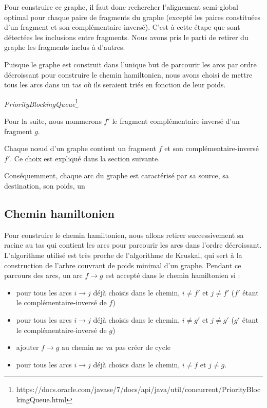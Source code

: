 \documentclass{article}
\begin{document}
Pour construire ce graphe, il faut donc rechercher l'alignement semi-global optimal pour chaque paire de fragments du graphe (excepté les paires constituées d'un fragment et son complémentaire-inversé). C'est à cette étape que sont détectées les inclusions entre fragments. Nous avons pris le parti de retirer du graphe les fragments inclus à d'autres.

Puisque le graphe est construit dans l'unique but de parcourir les arcs par ordre décroissant pour construire le chemin hamiltonien, nous avons choisi de mettre tous les arcs dans un tas où ils seraient triés en fonction de leur poids.

\textit{PriorityBlockingQueue}\footnote{https://docs.oracle.com/javase/7/docs/api/java/util/concurrent/PriorityBlockingQueue.html}

Pour la suite, nous nommerons $f'$ le fragment complémentaire-inversé d'un fragment $g$. 

Chaque nœud d'un graphe contient un fragment $f$ et son complémentaire-inversé $f'$. Ce choix est expliqué dans la section suivante.

Conséquemment, chaque arc du graphe est caractérisé par sa source, sa destination, son poids, un

\subsection{Chemin hamiltonien}

Pour construire le chemin hamiltonien, nous allons retirer successivement sa racine au tas qui contient les arcs pour parcourir les arcs dans l'ordre décroissant. L'algorithme utilisé est très proche de l'algorithme de Kruskal, qui sert à la construction de l'arbre couvrant de poids minimal d'un graphe.
Pendant ce parcours des arcs, un arc $f \to g$ est accepté dans le chemin hamiltonien si :

\begin{itemize}
\item pour tous les arcs $i \to j$ déjà choisis dans le chemin, $i \neq f'$ et $j \neq f'$  ($f'$ étant le complémentaire-inversé de $f$)
\item pour tous les arcs $i \to j$ déjà choisis dans le chemin, $i \neq g'$ et $j \neq g'$  ($g'$ étant le complémentaire-inversé de $g$)
\item ajouter $f \to g$ au chemin ne va pas créer de cycle
\item pour tous les arcs $i \to j$ déjà choisis dans le chemin, $i \neq f$ et $j \neq g$.
\end{itemize}
\end{document}
